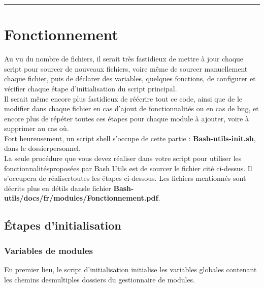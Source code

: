 \documentclass[a4paper,10pt]{article}
\begin{document}
\color{red}\par\noindent\rule{\textwidth}{0.4pt}\color{white}

\color{red}
\section{Fonctionnement}\color{white}
Au vu du nombre de fichiers, il serait très fastidieux de mettre à jour chaque script pour sourcer de nouveaux fichiers, voire même de sourcer manuellement chaque fichier, puis de déclarer des variables, quelques fonctions, de configurer et vérifier chaque étape d'initialisation du script principal.\\[1\baselineskip]

Il serait même encore plus fastidieux de réécrire tout ce code, ainsi que de le modifier dans chaque fichier en cas d'ajout de fonctionnalités ou en cas de bug, et encore plus de répéter toutes ces étapes pour chaque module à ajouter, voire à supprimer au cas où.\\[1\baselineskip]

Fort heureusement, un script shell s'occupe de cette partie : \color{lime}\textbf{Bash-utils-init.sh}\color{white}, dans le dossier\linebreak personnel.\\[1\baselineskip]

La seule procédure que vous devez réaliser dans votre script pour utiliser les fonctionnalités\linebreak proposées par Bash Utils est de sourcer le fichier cité ci-dessus. Il s'occupera de réaliser\linebreak toutes les étapes ci-dessous. Les fichiers mentionnés sont décrits plus en détils dans\linebreak le fichier \textbf{\color{lime}Bash-utils/docs/fr/modules/Fonctionnement.pdf\color{white}}.


\color{green}
\subsection{Étapes d'initialisation}\color{white}

\color{blue}
\subsubsection{Variables de modules}\color{white}
En premier lieu, le script d'initialisation initialise les variables globales contenant les chemins des\linebreak multiples dossiers du gestionnaire de modules.\\[1\baselineskip]
\end{document}
